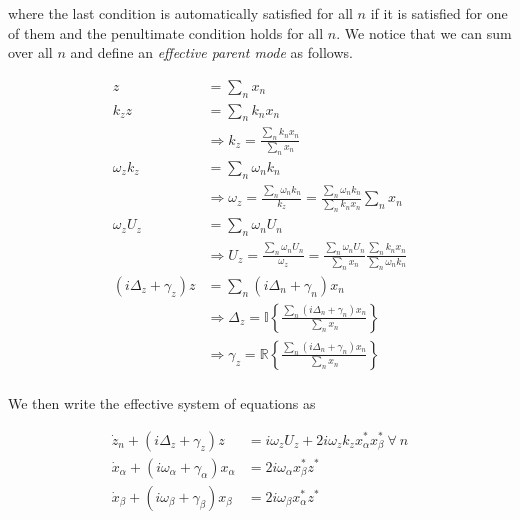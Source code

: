 where the last condition is automatically satisfied for all $n$ if it is satisfied for one of them and the penultimate condition holds for all $n$. We notice that we can sum over all $n$ and define an \emph{effective parent mode} as follows.

\begin{subequations}
\begin{align}
z & = \sum\limits_{n} x_n \\
k_z z & = \sum\limits_{n} k_n x_n \\
& \Rightarrow k_z = \frac{\sum\limits_{n} k_n x_n}{\sum\limits_{n} x_n} \\
\omega_z k_z & = \sum\limits_{n} \omega_n k_n \\
& \Rightarrow \omega_z = \frac{\sum\limits_{n} \omega_n k_n}{k_z} = \frac{\sum\limits_{n} \omega_n k_n}{\sum\limits_{n} k_n x_n} \sum\limits_{n} x_n \\
\omega_z U_z & = \sum\limits_{n} \omega_n U_n \\
& \Rightarrow U_z = \frac{ \sum\limits_{n} \omega_n U_n}{\omega_z} = \frac{ \sum\limits_{n} \omega_n U_n }{ \sum\limits_{n} x_n} \frac{\sum\limits_{n} k_n x_n}{\sum\limits_{n} \omega_n k_n} \\
(i\Delta_z+\gamma_z)z & = \sum\limits_{n} (i\Delta_n+\gamma_n)x_n \\
& \Rightarrow \Delta_z = \mathbb{I}\left\{ \frac{\sum\limits_{n} (i\Delta_n+\gamma_n)x_n}{\sum\limits_{n} x_n} \right\} \\
& \Rightarrow \gamma_z = \mathbb{R}\left\{ \frac{\sum\limits_{n} (i\Delta_n+\gamma_n)x_n}{\sum\limits_{n} x_n} \right\} \\
\end{align}
\end{subequations}

We then write the effective system of equations as

\begin{subequations}
\begin{align}
\dot{z}_n + (i\Delta_z+\gamma_z)z & = i\omega_z U_z + 2i\omega_z k_z x_\alpha^\ast x_\beta^\ast \  \forall\  n \\
\dot{x}_\alpha + (i\omega_\alpha+\gamma_\alpha)x_\alpha & = 2i\omega_\alpha x_\beta^\ast z^\ast \\
\dot{x}_\beta + (i\omega_\beta+\gamma_\beta)x_\beta & = 2i\omega_\beta x_\alpha^\ast z^\ast \\
\end{align}
\end{subequations}

